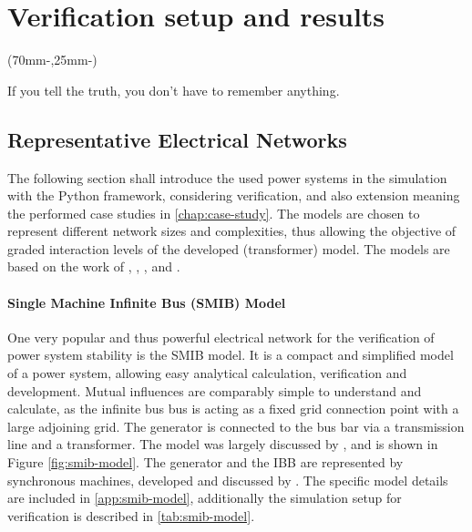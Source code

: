 

\chapter{Verification setup and results}

\begin{textblock*}{.7\textwidth}(70mm-\offset,25mm-\offset)
    \begin{fquote}
        If you tell the truth, you don't have to remember anything.
    \end{fquote}
\end{textblock*}

\section{Representative Electrical Networks}

The following section shall introduce the used power systems in the simulation with the Python framework, considering verification, and also extension meaning the performed case studies in \autoref{chap:case-study}. The models are chosen to represent different network sizes and complexities, thus allowing the objective of graded interaction levels of the developed (transformer) model. The models are based on the work of \textcite{machowskiPowerSystemDynamics2020}, \textcite{kundurPowerSystemStability2022}, \textcite{IEEEGuideLoad2022}, and \textcite{vancutsemTestSystemsVoltage2020}.

\subsubsection{Single Machine Infinite Bus (SMIB) Model}

One very popular and thus powerful electrical network for the verification of power system stability is the \acs{SMIB} model. It is a compact and simplified model of a power system, allowing easy analytical calculation, verification and development. Mutual influences are comparably simple to understand and calculate, as the infinite bus bus is acting as a fixed grid connection point with a large adjoining grid. The generator is connected to the bus bar via a transmission line and a transformer. The model was largely discussed by \textcite{kundurPowerSystemStability2022}, and is shown in Figure \ref{fig:smib-model}. The generator and the \acs{IBB} are represented by synchronous machines, developed and discussed by \textcite{kordowichPhysicsInformedMachine2023}. The specific model details are included in \autoref{app:smib-model}, additionally the simulation setup for verification is described in \autoref{tab:smib-model}.

